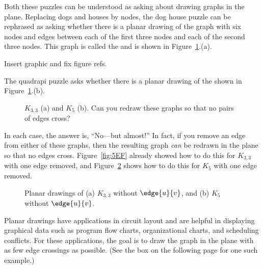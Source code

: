 Both these puzzles can be understood as asking about drawing graphs in the
plane.  Replacing dogs and houses by nodes, the dog house puzzle can be
rephrased as asking whether there is a planar drawing of the graph with
six nodes and edges between each of the first three nodes and each of the
second three nodes.  This graph is called the  and is shown in Figure~\ref{fig:nonplanar}.(a).
\begin{editingnotes}
Insert graphic and fix figure refs.
\end{editingnotes}
The quadrapi puzzle asks whether there is a planar drawing of the
  shown in
Figure~\ref{fig:nonplanar}.(b).

\begin{figure}

\qquad\qquad
{}

\caption{$K_{3, 3}$ (a) and $K_5$ (b).  Can you redraw these graphs so
that no pairs of edges cross?}

\label{fig:nonplanar}

\end{figure}

In each case, the answer is, ``No---but almost!''  In fact, if you remove
an edge from either of these graphs, then the resulting graph \emph{can}
be redrawn in the plane so that no edges cross.  Figure~\ref{fig:5EF}
already showed how to do this for $K_{3,3}$ with one edge removed, and
Figure~\ref{fig:5DC} 
shows how to do this for $K_5$ with one edge removed.

\begin{figure}

\qquad
{}

\caption{Planar drawings of (a) $K_{3, 3}$ without $\edge{u}{v}$, and
  (b) $K_5$ without $\edge{u}{v}$.}
\label{fig:5DC}
\end{figure}

Planar drawings have applications in circuit layout and are helpful in
displaying graphical data such as program flow charts, organizational
charts, and scheduling conflicts.  For these applications, the goal is
to draw the graph in the plane with as few edge crossings as possible.
(See the box on the following page for one such example.)

